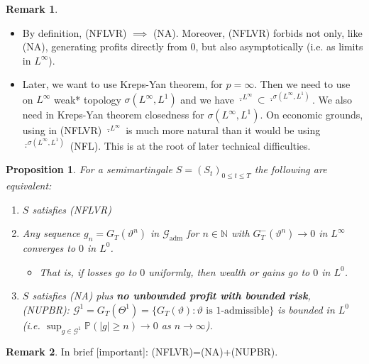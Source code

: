 \documentclass[12pt,a4paper, twoside]{article}
\newtheorem{prop}{Proposition}[section]
\theoremstyle{definition}
\newtheorem{rem}{Remark}[section]
\newcommand{\PP}{\mathbb{P}} %
\begin{document}
\begin{rem} \ \begin{itemize}
\item By definition, (NFLVR) $\implies$ (NA). Moreover, (NFLVR) forbids not only, like (NA), generating profits directly from $0$, but also asymptotically (i.e. as limits in $L^\infty$).
\item Later, we want to use Kreps-Yan theorem, for $p= \infty$. Then we need to use on $L^\infty$ weak* topology $\sigma( L^\infty, L^1)$ and we have $\overline{\cdot}^{L^\infty} \subset \overline{\cdot}^{\sigma(L^\infty, L^1)}$. We also need in Kreps-Yan theorem closedness for $\sigma(L^\infty, L^1)$. On economic grounds, using in (NFLVR) $\overline{\cdot}^{L^\infty}$ is much more natural than it would be using $\overline{\cdot}^{\sigma(L^\infty, L^1)}$ (NFL). This is at the root of later technical difficulties. 
\end{itemize}
\end{rem}
\begin{prop} \label{P43} For a semimartingale $S=(S_t)_{0 \leq t \leq T}$ the following are equivalent: 
\begin{enumerate}
\item $S$ satisfies (NFLVR) 
\item Any sequence $g_n= G_T( \vartheta^n)$ in $\mathcal{G}_\text{adm}$ for $n \in \mathbb{N}$ with $G_T^-( \vartheta^n) \to 0$ in $L^\infty$ converges to $0$ in $L^0$.
\begin{itemize}
\item That is, if losses go to $0$ uniformly, then wealth or gains go to $0$ in $L^0$. 
\end{itemize}
\item $S$ satisfies (NA) plus \textbf{no unbounded profit with bounded risk}, \\
(NUPBR): $\mathcal{G}^1 = G_T( \Theta^1)= \{ G_T( \vartheta): \vartheta \text{ is $1$-admissible}\}$ is bounded in $L^0$ (i.e. $\sup_{g \in \mathcal{G}^1} \PP( |g| \geq n) \to 0$ as $n \to \infty$).
\end{enumerate}
\end{prop}
\begin{rem} In brief [important]: (NFLVR)=(NA)+(NUPBR).
\end{rem}
\end{document}
